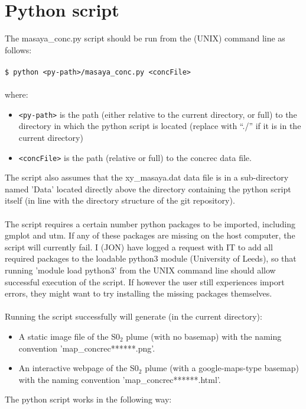 \documentclass[10pt,a4paper]{article}
\newcommand\tab[1][0.5cm]{\hspace*{#1}}
\begin{document}
\section{Python script}
The masaya\_conc.py script should be run from the (UNIX) command line as follows:\\\\
\tab \texttt{\$ python <py-path>/masaya\_conc.py <concFile>}\\\\
where:
\begin{itemize}
\item \texttt{<py-path>} is the path (either relative to the current directory, or full) to the directory in which the python script is located (replace with “./” if it is in the current directory)
\item \texttt{<concFile>} is the path (relative or full) to the concrec data file.
\end{itemize}
The script also assumes that the xy\_masaya.dat data file is in a sub-directory named 'Data' located directly above the directory containing the python script itself (in line with the directory structure of the git repository).\\\\
The script requires a certain number python packages to be imported, including gmplot and utm. If any of these packages are missing on the host computer, the script will currently fail. I (JON) have logged a request with IT to add all required packages to the loadable python3 module (University of Leeds), so that running 'module load python3' from the UNIX command line should allow successful execution of the script. If however the user still experiences import errors, they might want to try installing the missing packages themselves.\\\\
Running the script successfully will generate (in the current directory):
\begin{itemize}
\item A static image file of the S0$_2$ plume (with no basemap) with the naming convention 'map\_concrec******.png'.
\item An interactive webpage of the S0$_2$ plume (with a google-maps-type basemap) with the naming convention 'map\_concrec******.html'.
\end{itemize}
The python script works in the following way:
\end{document}

